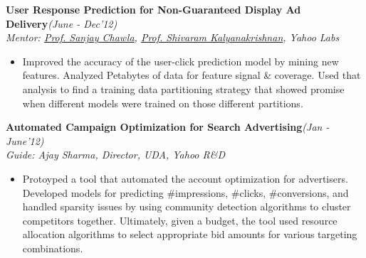 \textsf{\textbf{User Response Prediction for Non-Guaranteed Display Ad Delivery}}\hfill\textit{\small(June - Dec'12)}
\\ {\textit{Mentor: \href{http://www.pmg.it.usyd.edu.au/}{Prof. Sanjay Chawla}, \href{https://www.cse.iitb.ac.in/~shivaram/}{Prof. Shivaram Kalyanakrishnan}, Yahoo Labs}}
\normalsize
\begin{itemize}[leftmargin=*]\compresslist
    \item[] Improved the accuracy of the user-click prediction model by mining new features. Analyzed Petabytes of data for feature signal \& coverage. Used that analysis to find a training data partitioning strategy that showed promise when different models were trained on those different partitions.
\end{itemize}

\textsf{\textbf{Automated Campaign Optimization for Search Advertising}}\hfill\textit{\small(Jan - June'12)}
\\ {\textit{Guide: Ajay Sharma, Director, UDA, Yahoo R\&D}}
\normalsize
\begin{itemize}[leftmargin=*]\compresslist
    \item[] Protoyped a tool that automated the account optimization for advertisers. Developed models for predicting \#impressions, \#clicks, \#conversions, and handled sparsity issues by using community detection algorithms to cluster competitors together. Ultimately, given a budget, the tool used resource allocation algorithms to select appropriate bid amounts for various targeting combinations.
\end{itemize}



